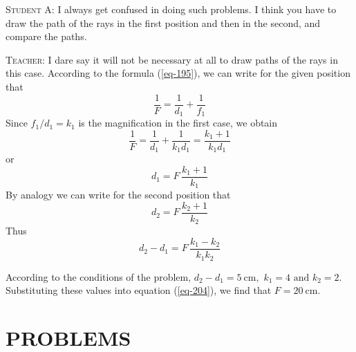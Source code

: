 \documentclass[a4paper,sfsidenotes]{tufte-book}
\begin{document}
\textsc{Student A:} I always get confused in doing such problems. I think you have to draw the path of the rays in the first position and then in the second, and compare the paths.

\textsc{Teacher:} I dare say it will not be necessary at all to draw paths of the rays in this case. According to the formula (\ref{eq-195}), we can write for the given position that 
\begin{equation*}
\frac{1}{F} = \frac{1}{d_{1}} + \frac{1}{f_{1}}
\end{equation*}
 Since $f_{1}/d_{1} = k_{1}$ is the magnification in the first case, we obtain
\begin{equation*}
\frac{1}{F} = \frac{1}{d_{1}} + \frac{1}{k_{1}d_{1}} = \frac{k_{1}+1}{k_{1}d_{1}}
\end{equation*}
 or 
\begin{equation*}
d_{1} = F \, \frac{k_{1}+1}{k_{1}}
\end{equation*}
By analogy we can write for the second position that
\begin{equation*}
d_{2} = F \, \frac{k_{2}+1}{k_{2}}
\end{equation*}
Thus 
\begin{equation}
d_{2} - d_{1} = F \, \frac{k_{1}-k_{2}}{k_{1}k_{2}} 
\label{eq-204}
\end{equation}

According to the conditions of the problem, $d_{2} - d_{1} = \SI{5}{\centi\metre}, \,\, k_{1}=4 \,\, \text{and} \,\, k_{2} = 2$. Substituting these values into equation (\ref{eq-204}), we find that $F = \SI{20}{\centi\metre}$.
\section{PROBLEMS}
\label{sec-35-1}
\end{document}
